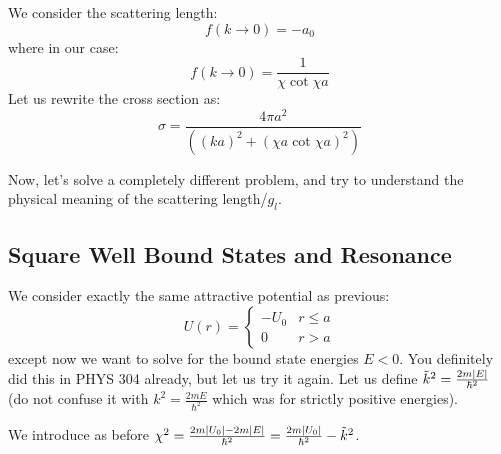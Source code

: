 We consider the scattering length:
\begin{equation}
    f(k \to 0) = -a_0
\end{equation}
where in our case:
\begin{equation}
    f(k \to 0) = \frac{1}{\chi \cot \chi a}
\end{equation}
Let us rewrite the cross section as:
\begin{equation}
    \sigma = \frac{4\pi a^2}{\left((ka)^2 + (\chi a\cot \chi a)^2\right)}
\end{equation}

Now, let's solve a completely different problem, and try to understand the physical meaning of the scattering length/$g_l$. 

\subsection{Square Well Bound States and Resonance}
We consider exactly the same attractive potential as previous:
\begin{equation}
    U(r) = \begin{cases}
        -U_0 & r \leq a
        \\ 0 & r > a
    \end{cases}
\end{equation}
except now we want to solve for the bound state energies $E < 0$. You definitely did this in PHYS 304 already, but let us try it again. Let us define $\tilde{k}^2 = \frac{2m\lvert E \rvert}{\hbar^2}$ (do not confuse it with $k^2 = \frac{2mE}{\hbar^2}$ which was for strictly positive energies). 

We introduce as before $\chi^2 = \frac{2m\lvert U_0 \rvert - 2m\lvert E \rvert}{\hbar^2} = \frac{2m\lvert U_0 \rvert}{\hbar^2} - \tilde{k}^2$. 

